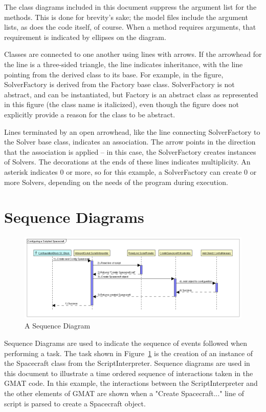 The class diagrams included in this document suppress the argument list for the methods.  This is
done for brevity's sake; the model files include the argument lists, as does the code itself, of
course.  When a method requires arguments, that requirement is indicated by ellipses on the diagram.

Classes are connected to one another using lines with arrows.  If the arrowhead for the line is a
three-sided triangle, the line indicates inheritance, with the line pointing from the derived class
to its base.  For example, in the figure, SolverFactory is derived from the Factory base class. 
SolverFactory is not abstract, and can be instantiated, but Factory is an abstract class as
represented in this figure (the class name is italicized), even though the figure does not
explicitly provide a reason for the class to be abstract.

Lines terminated by an open arrowhead, like the line connecting SolverFactory to the Solver base
class, indicates an association.  The arrow points in the direction that the association is applied
-- in this case, the SolverFactory creates instances of Solvers.  The decorations at the ends of
these lines indicates multiplicity.  An asterisk indicates 0 or more, so for this example, a
SolverFactory can create 0 or more Solvers, depending on the needs of the program during execution.

\section{Sequence Diagrams}

\begin{figure}[htb]
\begin{center}
\includegraphics[430,162]{Images/UmlSequenceSample.png}
\caption{\label{figure:UmlSequenceExample}A Sequence Diagram}
\end{center}
\end{figure}

Sequence Diagrams are used to indicate the sequence of events followed when performing a task.  The
task shown in Figure~\ref{figure:UmlSequenceExample} is the creation of an instance of the
Spacecraft class from the ScriptInterpreter.  Sequence diagrams are used in this document to
illustrate a time ordered sequence of interactions taken in the GMAT code.  In this example, the
interactions between the ScriptInterpreter and the other elements of GMAT are shown when a "Create
Spacecraft..." line of script is parsed to create a Spacecraft object.

